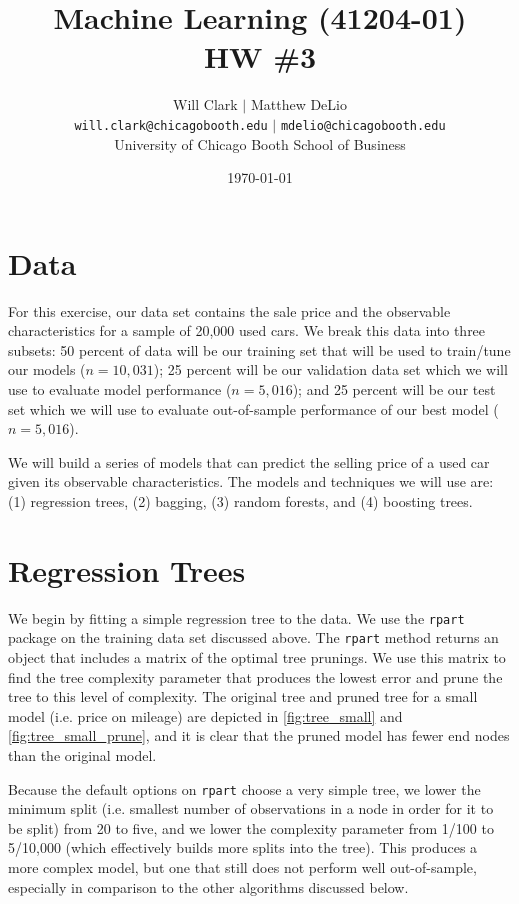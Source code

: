 \documentclass[11pt, fleqn]{article}
\begin{document}
\title{Machine Learning (41204-01)\\HW \#3}
\author{Will Clark $\vert$ Matthew DeLio \\
\texttt{will.clark@chicagobooth.edu} $\vert$ \texttt{mdelio@chicagobooth.edu} \\
University of Chicago Booth School of Business}
\date{\today}
\maketitle

\section{Data}

For this exercise, our data set contains the sale price and the observable characteristics for a sample of 20,000 used cars. We break this data into three subsets: 50 percent of data will be our training set that will be used to train/tune our models ($n=10,031$); 25 percent will be our validation data set which we will use to evaluate model performance ($n=5,016$); and 25 percent will be our test set which we will use to evaluate out-of-sample performance of our best model ($n=5,016$).

We will build a series of models that can predict the selling price of a used car given its observable characteristics. The models and techniques we will use are: (1) regression trees, (2) bagging, (3) random forests, and (4) boosting trees.

\section{Regression Trees}

We begin by fitting a simple regression tree to the data. We use the \texttt{rpart} package on the training data set discussed above. The \texttt{rpart} method returns an object that includes a matrix of the optimal tree prunings. We use this matrix to find the tree complexity parameter that produces the lowest error and prune the tree to this level of complexity. The original tree and pruned tree for a small model (i.e. price on mileage) are depicted in \cref{fig:tree_small} and \cref{fig:tree_small_prune}, and it is clear that the pruned model has fewer end nodes than the original model.

Because the default options on \texttt{rpart} choose a very simple tree, we lower the minimum split (i.e. smallest number of observations in a node in order for it to be split) from 20 to five, and we lower the complexity parameter from 1/100 to 5/10,000 (which effectively builds more splits into the tree). This produces a more complex model, but one that still does not perform well out-of-sample, especially in comparison to the other algorithms discussed below.
\end{document}
